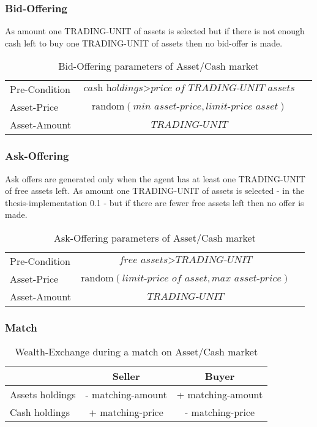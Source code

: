\documentclass[Bachelorarbeit.tex]{subfiles}
\begin{document}
\subsubsection{Bid-Offering}
As amount one TRADING-UNIT of assets is selected but if there is not enough cash left to buy one TRADING-UNIT of assets then no bid-offer is made.

\begin{table}[H]
	\centering
	\caption{Bid-Offering parameters of Asset/Cash market}
	\begin{tabular} { l c r }
		\hline
		Pre-Condition & $\textit{cash holdings} > \textit{price of TRADING-UNIT assets}$  \\
		Asset-Price & $\mathrm{random}(\textit{min asset-price}, \textit{limit-price asset})$ \\
		Asset-Amount & $\textit{TRADING-UNIT}$ \\
		\hline
	\end{tabular}
\end{table}

\subsubsection{Ask-Offering}
Ask offers are generated only when the agent has at least one TRADING-UNIT of free assets left. As amount one TRADING-UNIT of assets is selected - in the thesis-implementation 0.1 - but if there are fewer free assets left then no offer is made.

\begin{table}[H]
	\centering
	\caption{Ask-Offering parameters of Asset/Cash market}
	\begin{tabular} { l c r }
		\hline
		Pre-Condition & $\textit{free assets} > \textit{TRADING-UNIT}$  \\
		Asset-Price & $\mathrm{random}(\textit{limit-price of asset}, \textit{max asset-price})$ \\
		Asset-Amount & $\textit{TRADING-UNIT}$ \\
		\hline
	\end{tabular}
\end{table}


\subsubsection{Match}

\begin{table}[H]
	\centering
	\caption{Wealth-Exchange during a match on Asset/Cash market}
	\begin{tabular} { l c c }
		& Seller & Buyer \\
		\hline
		Assets holdings & - matching-amount & + matching-amount \\
		Cash holdings  & + matching-price & - matching-price \\
		\hline
	\end{tabular}
\end{table}
\end{document}
